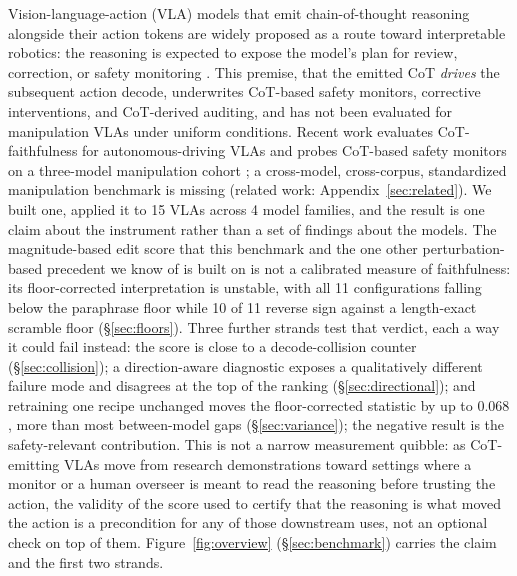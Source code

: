 \documentclass{article}
\begin{document}
Vision-language-action (VLA) models that emit chain-of-thought reasoning alongside their action tokens are widely proposed as a route toward interpretable robotics: the reasoning is expected to expose the model's plan for review, correction, or safety monitoring \citep{ecot}. This premise, that the emitted CoT \emph{drives} the subsequent action decode, underwrites CoT-based safety monitors, corrective interventions, and CoT-derived auditing, and has not been evaluated for manipulation VLAs under uniform conditions. Recent work evaluates CoT-faithfulness for autonomous-driving VLAs \citep{vladrivebench,pinocchio} and probes CoT-based safety monitors on a three-model manipulation cohort \citep{doubleedged}; a cross-model, cross-corpus, standardized manipulation benchmark is missing (related work: Appendix~\ref{sec:related}). We built one, applied it to 15 VLAs across 4 model families, and the result is one claim about the instrument rather than a set of findings about the models. The magnitude-based edit score that this benchmark and the one other perturbation-based precedent we know of is built on is not a calibrated measure of faithfulness: its floor-corrected interpretation is unstable, with all 11 configurations falling below the paraphrase floor while 10 of 11 reverse sign against a length-exact scramble floor (\S\ref{sec:floors}). Three further strands test that verdict, each a way it could fail instead: the score is close to a decode-collision counter (\S\ref{sec:collision}); a direction-aware diagnostic exposes a qualitatively different failure mode and disagrees at the top of the ranking (\S\ref{sec:directional}); and retraining one recipe unchanged moves the floor-corrected statistic by up to $0.068$, more than most between-model gaps (\S\ref{sec:variance}); the negative result is the safety-relevant contribution. This is not a narrow measurement quibble: as CoT-emitting VLAs move from research demonstrations toward settings where a monitor or a human overseer is meant to read the reasoning before trusting the action, the validity of the score used to certify that the reasoning is what moved the action is a precondition for any of those downstream uses, not an optional check on top of them. Figure~\ref{fig:overview} (\S\ref{sec:benchmark}) carries the claim and the first two strands.
\end{document}
